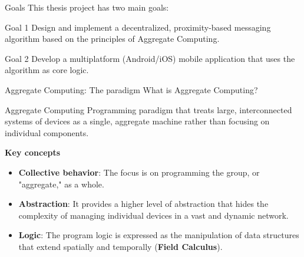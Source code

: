 \documentclass[aspectratio=169,xcolor=dvipsnames]{beamer}
\begin{document}

\begin{frame}{Goals}
    This thesis project has two main goals:
     \begin{block}{Goal 1}
        Design and implement a decentralized, proximity-based messaging algorithm based on the principles of Aggregate Computing.    
    \end{block}
    \vspace{0.5cm}
    \begin{block}{Goal 2}
        Develop a multiplatform (Android/iOS) mobile application that uses the algorithm as core logic.
    \end{block}

\end{frame}

\begin{frame}{Aggregate Computing: The paradigm}
    What is Aggregate Computing?
    \begin{block}{Aggregate Computing}
        Programming paradigm that treats large, interconnected systems of devices as a single, aggregate machine rather than focusing on individual components.
    \end{block}
    \vspace{0.3cm}
    {\Large\textbf{Key concepts}}
    \begin{block}{}
        \begin{itemize}
        \item \textbf{Collective behavior}: The focus is on programming the group, or "aggregate," as a whole.
        \item \textbf{Abstraction}: It provides a higher level of abstraction that hides the complexity of managing individual devices in a vast and dynamic network.
        \item \textbf{Logic}: The program logic is expressed as the manipulation of data structures that extend spatially and temporally (\textbf{Field Calculus}).
    \end{itemize}
    \end{block}
    
    
    

\end{frame}
\end{document}
